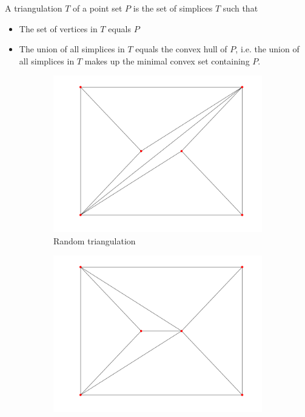 \begin{definition}[Triangulation]
A triangulation $T$ of a point set $P$ is the set of simplices $T$ such that
\begin{itemize}
    \item The set of vertices in $T$ equals $P$
    \item The union of all simplices in $T$ equals the convex hull of $P$, i.e. the union of all simplices in $T$ makes up the minimal convex set containing $P$.
\end{itemize}
\end{definition}
\begin{figure}[ht]
    \centering
    \begin{subfigure}[b]{0.4\textwidth}
        \centering
        \includegraphics[width=\textwidth]{report/Images/Theory/triangulation/triangulation_random.png}
        \caption{Random triangulation}
        \label{fig:triangulation-random}
    \end{subfigure}
    \begin{subfigure}[b]{0.4\textwidth}
        \centering
        \includegraphics[width=\textwidth]{report/Images/Theory/triangulation/triangulation_delaunay.png}

\end{subfigure}
\end{figure}
